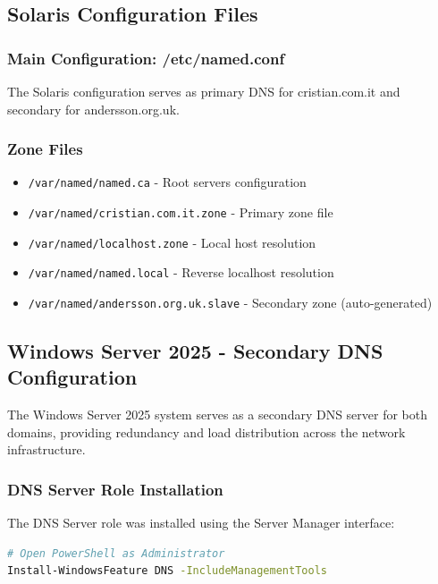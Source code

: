 \documentclass[12pt,a4paper]{article}
\begin{document}
\subsection{Solaris Configuration Files}

\subsubsection{Main Configuration: /etc/named.conf}
The Solaris configuration serves as primary DNS for cristian.com.it and secondary for andersson.org.uk.

\subsubsection{Zone Files}
\begin{itemize}
    \item \texttt{/var/named/named.ca} - Root servers configuration
    \item \texttt{/var/named/cristian.com.it.zone} - Primary zone file
    \item \texttt{/var/named/localhost.zone} - Local host resolution
    \item \texttt{/var/named/named.local} - Reverse localhost resolution
    \item \texttt{/var/named/andersson.org.uk.slave} - Secondary zone (auto-generated)
\end{itemize}

\subsection{Windows Server 2025 - Secondary DNS Configuration}\label{subsec:windows-dns}

The Windows Server 2025 system serves as a secondary DNS server for both domains, providing redundancy and load distribution across the network infrastructure.

\subsubsection{DNS Server Role Installation}
The DNS Server role was installed using the Server Manager interface:

\begin{lstlisting}[language=bash, caption=Installing DNS Server Role]
# Open PowerShell as Administrator
Install-WindowsFeature DNS -IncludeManagementTools
\end{lstlisting}
\end{document}
